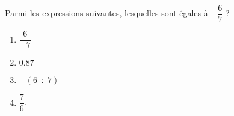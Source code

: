 
\begin{exercice}[\ldots /2]\label{exosmath-0772}

    Parmi les expressions suivantes, lesquelles sont égales à \( -\dfrac{ 6 }{ 7 }\) ?
    \begin{multicols}{2}
        \begin{enumerate}
            \item
                \( \dfrac{ 6 }{ -7 }\)
            \item
                \( 0.87\)
            \item
                \( -(6\div 7)\)
            \item
                \( \dfrac{ 7 }{ 6 }\).
        \end{enumerate}
    \end{multicols}

\end{exercice}
